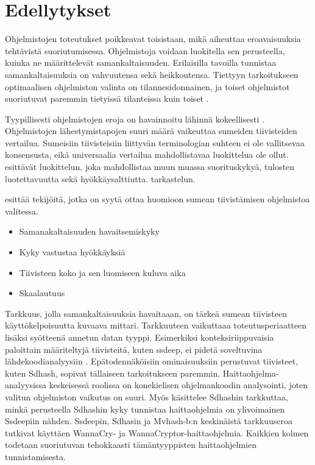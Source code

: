 \section{Edellytykset}

Ohjelmistojen toteutukset poikkeavat toisistaan, mikä aiheuttaa
eroavaisuuksia tehtävistä suoriutumisessa. 
Ohjelmistoja voidaan luokitella sen perusteella, kuinka
ne määrittelevät samankaltaisuuden. Erilaisilla tavoilla
tunnistaa samankaltaisuuksia on vahvuutensa sekä heikkoutensa.
Tiettyyn tarkoitukseen optimaalisen ohjelmiston valinta
on tilannesidonnainen, ja toiset ohjelmistot suoriutuvat
paremmin tietyissä tilanteissa kuin toiset \parencite{pagani18}.

Tyypillisesti ohjelmistojen eroja on havainnoitu lähinnä kokeellisesti
\parencite{martin-perez21}.
Ohjelmistojen lähestymistapojen suuri määrä vaikeuttaa sumeiden tiivisteiden
vertailua. Sumeisiin tiivisteisiin liittyvän terminologian suhteen ei ole
vallitsevaa konsensusta, eikä universaalia vertailua mahdollistavaa luokittelua
ole ollut. \textcite{martin-perez21} esittävät luokittelun, joka mahdollistaa
muun muassa suorituskykyä, tulosten luotettavuutta sekä hyökkäysalttiutta.
tarkastelun.

\textcite{tlsh} esittää tekijöitä, jotka on syytä ottaa huomioon sumean tiivistämisen ohjelmistoa valitessa.

\begin{itemize}
\item Samanakaltaisuuden havaitsemiskyky
\item Kyky vastustaa hyökkäyksiä
\item Tiivisteen koko ja sen luomiseen kuluva aika 
\item Skaalautuus
\end{itemize}

Tarkkuus, jolla samankaltaisuuksia havaitaaan, on
tärkeä sumean tiivisteen käyttökelpoisuutta kuvaava
mittari. Tarkkuuteen vaikuttaaa toteutusperiaatteen
lisäksi syötteenä annetun datan tyyppi. Esimerkiksi
konteksiriippuvaisia paloittain määriteltyjä tiivisteitä,
kuten ssdeep, ei pidetä soveltuvina lähdekoodianalyysiin
\parencite{pagani18}. Epätodennäköisiin ominaisuuksiin
perustuvat tiivisteet, kuten Sdhash, sopivat tällaiseen tarkoitukseen
paremmin. Haittaohjelma-analyysissa keskeisessä roolissa on
konekielisen ohjelmankoodin analysointi, joten valitun ohjelmiston
vaikutus on suuri. Myös \textcite{roussev11} käsittelee Sdhashin
tarkkuttaa, minkä perusteella Sdhashin kyky tunnistaa haittaohjelmia
on ylivoimainen Ssdeepiin nähden. Ssdeepin, Sdhasin ja
Mvhash-b:n keskinäistä tarkkuuseroa
tutkivat \textcite{naik19} käyttäen WannaCry- ja
WannaCryptor-haittaohjelmia. Kaikkien kolmen 
todetaan suoriutuvan tehokkaasti tämäntyyppisten
haittaohjelmien tunnistamisesta.

